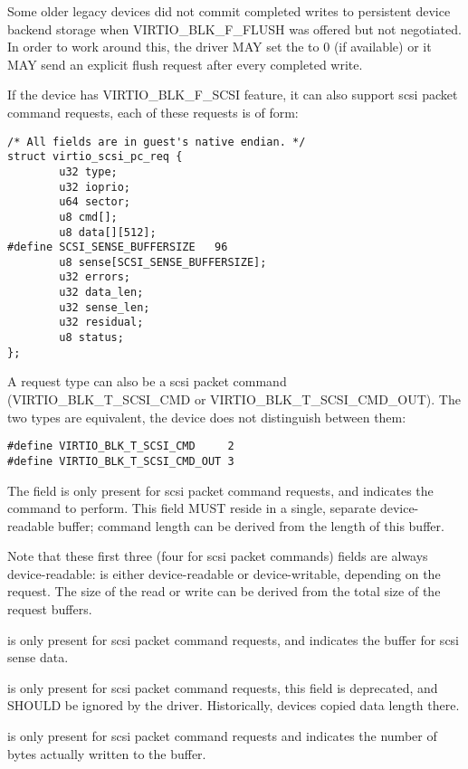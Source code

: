 Some older legacy devices did not commit completed writes to persistent
device backend storage when VIRTIO_BLK_F_FLUSH was offered but not
negotiated.  In order to work around this, the driver MAY set the
 to 0 (if available) or it MAY send an explicit flush
request after every completed write.

If the device has VIRTIO_BLK_F_SCSI feature, it can also support
scsi packet command requests, each of these requests is of form:

\begin{lstlisting}
/* All fields are in guest's native endian. */
struct virtio_scsi_pc_req {
        u32 type;
        u32 ioprio;
        u64 sector;
        u8 cmd[];
        u8 data[][512];
#define SCSI_SENSE_BUFFERSIZE   96
        u8 sense[SCSI_SENSE_BUFFERSIZE];
        u32 errors;
        u32 data_len;
        u32 sense_len;
        u32 residual;
        u8 status;
};
\end{lstlisting}

A request type can also be a scsi packet command (VIRTIO_BLK_T_SCSI_CMD or
VIRTIO_BLK_T_SCSI_CMD_OUT).  The two types are equivalent, the device
does not distinguish between them:

\begin{lstlisting}
#define VIRTIO_BLK_T_SCSI_CMD     2
#define VIRTIO_BLK_T_SCSI_CMD_OUT 3
\end{lstlisting}

The  field is only present for scsi packet command requests,
and indicates the command to perform. This field MUST reside in a
single, separate device-readable buffer; command length can be derived
from the length of this buffer.

Note that these first three (four for scsi packet commands)
fields are always device-readable:  is either device-readable
or device-writable, depending on the request. The size of the read or
write can be derived from the total size of the request buffers.

 is only present for scsi packet command requests,
and indicates the buffer for scsi sense data.

 is only present for scsi packet command
requests, this field is deprecated, and SHOULD be ignored by the
driver. Historically, devices copied data length there.

 is only present for scsi packet command
requests and indicates the number of bytes actually written to
the  buffer.

